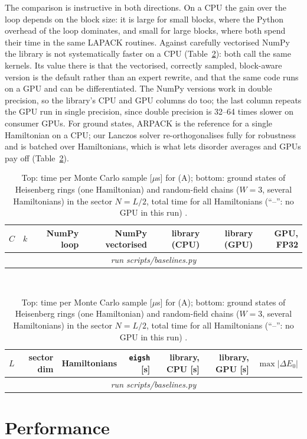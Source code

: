 \documentclass[11pt]{article}
\providecommand{\BaseMCRows}{\multicolumn{7}{c}{\emph{run scripts/baselines.py}}\\}
\providecommand{\BaseGSRows}{\multicolumn{7}{c}{\emph{run scripts/baselines.py}}\\}
\begin{document}
The comparison is instructive in both directions. On a CPU the gain over the loop depends on the block size: it is
large for small blocks, where the Python overhead of the loop dominates, and small for large blocks, where both spend
their time in the same LAPACK routines. Against carefully vectorised NumPy the library is not systematically faster on a
CPU (Table~\ref{tab:baselines}): both call the same kernels. Its value there is that the vectorised, correctly
sampled, block-aware version is the default rather than an expert rewrite, and that the same code runs on a GPU
and can be differentiated. The NumPy versions work in double precision, so the library's CPU and GPU columns do too;
the last column repeats the GPU run in single precision, since double precision is 32--64 times slower on consumer
GPUs. For ground states, ARPACK is the reference for a single Hamiltonian on a CPU; our Lanczos solver
re-orthogonalises fully for robustness and is batched over Hamiltonians, which is what lets disorder averages and GPUs
pay off (Table~\ref{tab:baselines}).

\begin{table}[h]
\centering\small
\begin{tabular}{rrrrrrr}
\toprule
$C$ & $k$ & NumPy loop & NumPy vectorised & library (CPU) & library (GPU) & GPU, FP32\\
\midrule
\BaseMCRows
\bottomrule
\end{tabular}\\[2mm]
\begin{tabular}{rrrrrrr}
\toprule
$L$ & sector dim & Hamiltonians & \texttt{eigsh} [s] & library, CPU [s] & library, GPU [s] & $\max|\Delta E_0|$\\
\midrule
\BaseGSRows
\bottomrule
\end{tabular}
\caption{Top: time per Monte Carlo sample [$\mu$s] for (A); bottom: ground states of Heisenberg rings
(one Hamiltonian) and random-field chains ($W=3$, several Hamiltonians) in the sector $N=L/2$, total time for all
Hamiltonians (``--'': no GPU in this run)
.}
\label{tab:baselines}
\end{table}

\section{Performance}\label{sec:performance}
\end{document}
